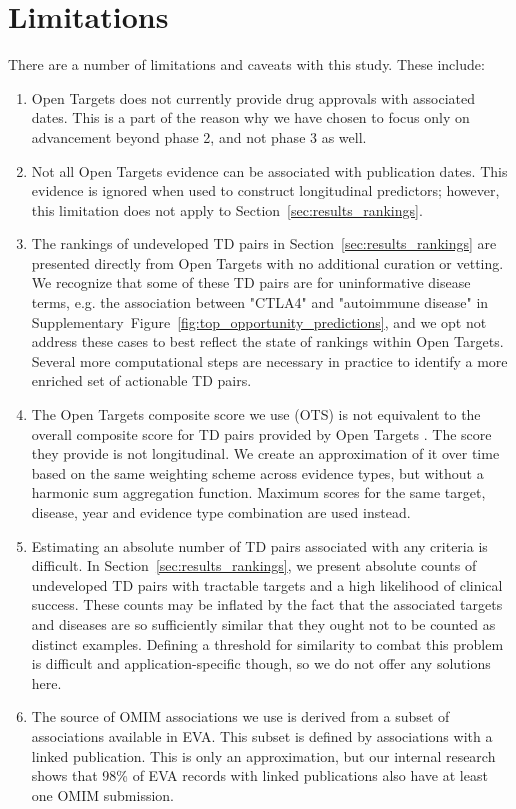 \documentclass{article}
\begin{document}
\section{Limitations}
\label{sec:limitations}

There are a number of limitations and caveats with this study. These include:

\begin{enumerate}[topsep=0pt,itemsep=-1ex,partopsep=1ex,parsep=1ex]
  \item Open Targets does not currently provide drug approvals with associated dates. This is a part of the reason why we have chosen to focus only on advancement beyond phase 2, and not phase 3 as well. 
  \item Not all Open Targets evidence can be associated with publication dates. This evidence is ignored when used to construct longitudinal predictors; however, this limitation does not apply to Section~\ref{sec:results_rankings}.
  \item The rankings of undeveloped TD pairs in Section~\ref{sec:results_rankings} are presented directly from Open Targets with no additional curation or vetting. We recognize that some of these TD pairs are for uninformative disease terms, e.g. the association between "CTLA4" and "autoimmune disease" in Supplementary~Figure~\ref{fig:top_opportunity_predictions}, and we opt not address these cases to best reflect the state of rankings within Open Targets. Several more computational steps are necessary in practice to identify a more enriched set of actionable TD pairs.
  \item The Open Targets composite score we use (OTS) is not equivalent to the overall composite score for TD pairs provided by Open Targets \cite{OTscoring}. The score they provide is not longitudinal. We create an approximation of it over time based on the same weighting scheme across evidence types, but without a harmonic sum aggregation function. Maximum scores for the same target, disease, year and evidence type combination are used instead.
  \item Estimating an absolute number of TD pairs associated with any criteria is difficult. In Section~\ref{sec:results_rankings}, we present absolute counts of undeveloped TD pairs with tractable targets and a high likelihood of clinical success. These counts may be inflated by the fact that the associated targets and diseases are so sufficiently similar that they ought not to be counted as distinct examples. Defining a threshold for similarity to combat this problem is difficult and application-specific though, so we do not offer any solutions here.
  \item The source of OMIM associations we use is derived from a subset of associations available in EVA. This subset is defined by associations with a linked publication. This is only an approximation, but our internal research shows that 98\% of EVA records with linked publications also have at least one OMIM submission.
\end{enumerate}
\end{document}
